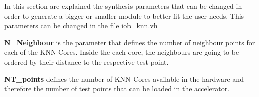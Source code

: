 In this section are explained the synthesis parameters that can be changed in
order to generate a bigger or smaller module to better fit the user needs.
This parameters can be changed in the file iob\_knn.vh

\textbf{N\_Neighbour} is the parameter that defines the number of neighbour points for each of the KNN Cores. Inside the each core, the neighbours are going to be ordered by their distance to the respective test point.

\textbf{NT\_points} defines the number of KNN Cores available in the hardware and therefore the number of test points that can be loaded in the accelerator.
